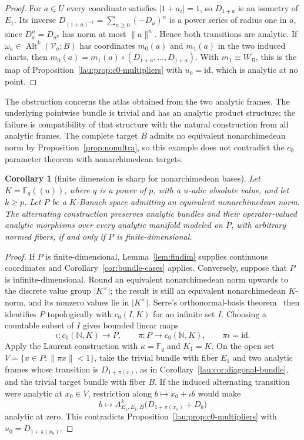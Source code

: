 \documentclass[11pt]{amsart}
\newtheorem{corollary}[theorem]{Corollary}
\theoremstyle{definition}
\theoremstyle{remark}
\numberwithin{equation}{section}
\newcommand{\N}{\mathbb N}
\newcommand{\F}{\mathbb F}
\newcommand{\Alt}{\operatorname{Alt}}
\newcommand{\id}{\mathrm{id}}
\newcommand{\abs}[1]{\lvert #1\rvert}
\newcommand{\norm}[1]{\lVert #1\rVert}
\begin{document}
\begin{proof}
For $a\in U$ every coordinate satisfies $\abs{1+a_i}=1$, so $D_{1+a}$ is an isometry of $E_1$. Its inverse
$D_{(1+a)^{-1}}=\sum_{n\ge0}(-D_a)^n$ is a power series of radius one in $a$, since $D_a^n=D_{a^n}$ has norm at most
$\norm a^n$. Hence both transitions are analytic. If $\omega_a\in\Alt^k(\mathcal V_a;B)$ has coordinates $m_0(a)$ and
$m_1(a)$ in the two induced charts, then $m_0(a)=m_1(a)\circ(D_{1+a},\dots,D_{1+a})$. With $m_1\equiv W_B$, this is the
map of Proposition~\ref{lau:prop:c0-multipliers} with $u_0=\id$, which is analytic at no point.
\end{proof}


The obstruction concerns the atlas obtained from the two analytic frames. The underlying pointwise bundle is trivial and has an analytic product structure; the failure is compatibility of that structure with the natural construction from all analytic frames. The complete target $B$ admits no equivalent nonarchimedean norm by Proposition~\ref{prop:nonultra}, so this example does not contradict the $c_0$ parameter theorem with nonarchimedean targets.

\begin{corollary}[finite dimension is sharp for nonarchimedean bases]\label{lau:cor:dichotomy}
Let $K=\F_q((u))$, where $q$ is a power of $p$, with a $u$\nobreakdash-adic absolute value, and let $k\ge p$. Let $P$ be a $K$\nobreakdash-Banach space admitting an equivalent nonarchimedean norm. The alternating construction preserves analytic bundles and their operator-valued analytic morphisms over every analytic manifold modeled on $P$, with arbitrary normed fibers, if and only if $P$ is finite-dimensional.
\end{corollary}

\begin{proof}
If $P$ is finite-dimensional, Lemma~\ref{lem:findim} supplies continuous coordinates and Corollary~\ref{cor:bundle-cases} applies. Conversely, suppose that $P$ is infinite-dimensional. Round an equivalent nonarchimedean norm upwards to the discrete value group $\abs{K^\times}$; the result is still an equivalent nonarchimedean $K$\nobreakdash-norm, and its nonzero values lie in $\abs{K^\times}$. Serre's orthonormal-basis theorem~\cite[\S1, Proposition~1]{Se} then identifies $P$ topologically with $c_0(I,K)$ for an infinite set $I$. Choosing a countable subset of $I$ gives bounded linear maps
\[
 \iota\colon c_0(\N,K)\longrightarrow P,\qquad
 \pi\colon P\longrightarrow c_0(\N,K),\qquad \pi\iota=\id.
\]
Apply the Laurent construction with $\kappa=\F_q$ and $K_1=K$. On the open set $V=\{x\in P:\norm{\pi x}<1\}$, take the trivial bundle with fiber $E_1$ and two analytic frames whose transition is $D_{1+\pi(x)}$, as in Corollary~\ref{lau:cor:diagonal-bundle}, and the trivial target bundle with fiber $B$. If the induced alternating transition were analytic at $x_0\in V$, restriction along $b\mapsto x_0+\iota b$ would make
\[
 b\longmapsto A^k_{E_1,E_1;B}\bigl(D_{1+\pi(x_0)}+D_b\bigr)
\]
analytic at zero. This contradicts Proposition~\ref{lau:prop:c0-multipliers} with $u_0=D_{1+\pi(x_0)}$.
\end{proof}
\end{document}
